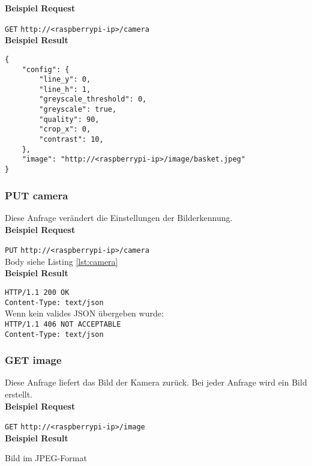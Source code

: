 \textbf{Beispiel Request}

\texttt{GET} 
\texttt{http://<raspberrypi-ip>/camera}\\

\textbf{Beispiel Result}

\begin{lstlisting}[caption=GET camera Result, label=lst:camera, tabsize=2]
{
	"config": {
		"line_y": 0, 
		"line_h": 1, 
		"greyscale_threshold": 0,
		"greyscale": true, 
		"quality": 90, 
		"crop_x": 0, 
		"contrast": 10, 
	},
	"image": "http://<raspberrypi-ip>/image/basket.jpeg"
}
\end{lstlisting}

\subsubsection{PUT camera}

Diese Anfrage verändert die Einstellungen der Bilderkennung.\\

\textbf{Beispiel Request}

\texttt{PUT}
\texttt{http://<raspberrypi-ip>/camera} \\
Body siehe Listing \ref{lst:camera}\\

\textbf{Beispiel Result}

\texttt{HTTP/1.1 200 OK} \\
\texttt{Content-Type: text/json} \\

\noindent
Wenn kein valides JSON übergeben wurde: \\

\noindent
\texttt{HTTP/1.1 406 NOT ACCEPTABLE} \\
\texttt{Content-Type: text/json}

\subsubsection{GET image}

Diese Anfrage liefert das Bild der Kamera zurück. Bei jeder Anfrage wird ein Bild erstellt.\\

\textbf{Beispiel Request}

\texttt{GET} 
\texttt{http://<raspberrypi-ip>/image}\\

\textbf{Beispiel Result}

Bild im JPEG-Format


